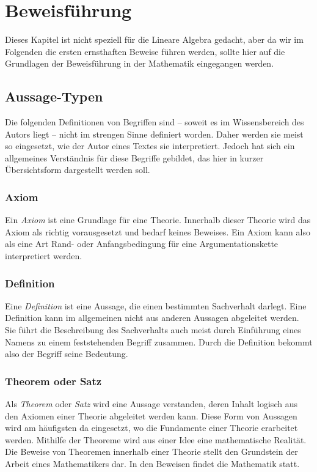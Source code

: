 
\chapter{Beweisführung}

Dieses Kapitel ist nicht speziell für die Lineare Algebra gedacht, aber da wir im Folgenden die ersten ernsthaften Beweise führen werden, sollte hier auf die Grundlagen der Beweisführung in der Mathematik eingegangen werden.

\section{Aussage-Typen}

Die folgenden Definitionen von Begriffen sind -- soweit es im Wissensbereich des Autors liegt -- nicht im strengen Sinne definiert worden. Daher werden sie meist so eingesetzt, wie der Autor eines Textes sie interpretiert. Jedoch hat sich ein allgemeines Verständnis für diese Begriffe gebildet, das hier in kurzer Übersichtsform dargestellt werden soll.

\subsection{Axiom}

Ein \textsl{Axiom} ist eine Grundlage für eine Theorie. Innerhalb dieser Theorie wird das Axiom als richtig vorausgesetzt und bedarf keines Beweises. Ein Axiom kann also als eine Art Rand- oder Anfangsbedingung für eine Argumentationskette interpretiert werden.

\subsection{Definition}

Eine \textsl{Definition} ist eine Aussage, die einen bestimmten Sachverhalt darlegt. Eine Definition kann im allgemeinen nicht aus anderen Aussagen abgeleitet werden. Sie führt die Beschreibung des Sachverhalts auch meist durch Einführung eines Namens zu einem feststehenden Begriff zusammen. Durch die Definition bekommt also der Begriff seine Bedeutung.

\subsection{Theorem oder Satz}

Als \textsl{Theorem} oder \textsl{Satz} wird eine Aussage verstanden, deren Inhalt logisch aus den Axiomen einer Theorie abgeleitet werden kann. Diese Form von Aussagen wird am häufigsten da eingesetzt, wo die Fundamente einer Theorie erarbeitet werden. Mithilfe der Theoreme wird aus einer Idee eine mathematische Realität. Die Beweise von Theoremen innerhalb einer Theorie stellt den Grundstein der Arbeit eines Mathematikers dar. In den Beweisen findet die Mathematik statt.

